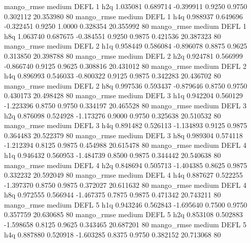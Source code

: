        mango_rmse     medium     DEFL                 1                  h2q  1.035081 0.689714 -0.399911 0.9250 0.9750  0.302112   20.353980 80
       mango_rmse     medium     DEFL                 1                  h4q  0.988937 0.649696 -0.322451 0.9250 1.0000  0.328354   20.355992 80
       mango_rmse     medium     DEFL                 1                  h8q  1.063740 0.687675 -0.384551 0.9250 0.9875  0.421536   20.387323 80
       mango_rmse     medium     DEFL                 2                  h1q  0.958449 0.586084 -0.896078 0.8875 0.9625  0.313850   20.398788 80
       mango_rmse     medium     DEFL                 2                  h2q  0.924781 0.566999 -0.866740 0.9125 0.9625  0.308816   20.431012 80
       mango_rmse     medium     DEFL                 2                  h4q  0.896993 0.546033 -0.800322 0.9125 0.9875  0.342283   20.436702 80
       mango_rmse     medium     DEFL                 2                  h8q  0.997536 0.593437 -0.879646 0.8750 0.9750  0.430173   20.498428 80
       mango_rmse     medium     DEFL                 3                  h1q  0.942204 0.560129 -1.223396 0.8750 0.9750  0.334197   20.465528 80
       mango_rmse     medium     DEFL                 3                  h2q  0.876098 0.524928 -1.173276 0.9000 0.9750  0.325638   20.510532 80
       mango_rmse     medium     DEFL                 3                  h4q  0.891482 0.526113 -1.134893 0.9125 0.9875  0.364483   20.522379 80
       mango_rmse     medium     DEFL                 3                  h8q  0.989304 0.574118 -1.212394 0.8125 0.9875  0.454988   20.615478 80
       mango_rmse     medium     DEFL                 4                  h1q  0.946432 0.560953 -1.484739 0.8500 0.9875  0.344442   20.540638 80
       mango_rmse     medium     DEFL                 4                  h2q  0.848694 0.505713 -1.404385 0.8625 0.9875  0.332232   20.592049 80
       mango_rmse     medium     DEFL                 4                  h4q  0.887627 0.522255 -1.397370 0.8750 0.9875  0.372027   20.611632 80
       mango_rmse     medium     DEFL                 4                  h8q  0.972555 0.566944 -1.467375 0.7875 0.9875  0.471342   20.743211 80
       mango_rmse     medium     DEFL                 5                  h1q  0.943246 0.562843 -1.695640 0.7500 0.9750  0.357759   20.630685 80
       mango_rmse     medium     DEFL                 5                  h2q  0.853108 0.502883 -1.598658 0.8125 0.9625  0.343465   20.687201 80
       mango_rmse     medium     DEFL                 5                  h4q  0.887880 0.520918 -1.603285 0.8375 0.9750  0.382152   20.713068 80
